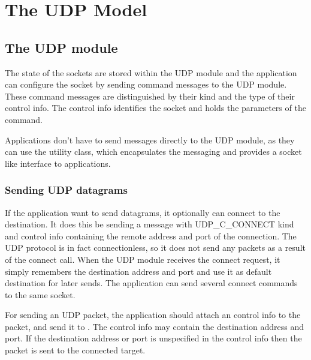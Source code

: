 \chapter{The UDP Model}
\label{cha:udp}

\section{The UDP module}

The state of the sockets are stored within the UDP module and the application
can configure the socket by sending command messages to the UDP module.
These command messages are distinguished by their kind and the type of their
control info. The control info identifies the socket and holds the parameters
of the command.

Applications don't have to send messages directly to the UDP module,
as they can use the  utility class, which encapsulates the messaging and
provides a socket like interface to applications.

\subsection{Sending UDP datagrams}

If the application want to send datagrams, it optionally can connect to the destination.
It does this be sending a message with UDP\_C\_CONNECT kind and 
control info containing the remote address and port of the connection.
The UDP protocol is in fact connectionless, so it does not send any packets as a result
of the connect call. When the UDP module receives the connect request,
it simply remembers the destination address and port and use it as default destination
for later sends. The application can send several connect commands to the same socket.



For sending an UDP packet, the application should attach an 
control info to the packet, and send it to . The control info may contain
the destination address and port. If the destination address or port
is unspecified in the control info then the packet is sent to the connected target.

